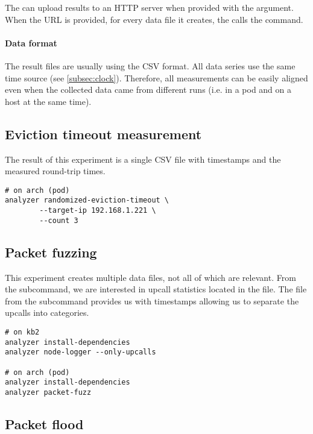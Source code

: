 The  can upload results to an HTTP server when provided with the  argument. When the URL is provided, for every data file it creates, the  calls the  command. 

\paragraph{Data format}

The result files are usually using the CSV format. All data series use the same time source (see \cref{subsec:clock}). Therefore, all measurements can be easily aligned even when the collected data came from different  runs (i.e. in a pod and on a host at the same time).

\subsection{Eviction timeout measurement}

The result of this experiment is a single CSV file with timestamps and the measured round-trip times.

\begin{verbatim}
# on arch (pod)
analyzer randomized-eviction-timeout \
		--target-ip 192.168.1.221 \
		--count 3
\end{verbatim}

\subsection{Packet fuzzing}

This experiment creates multiple data files, not all of which are relevant. From the  subcommand, we are interested in upcall statistics located in the  file. The  file from the  subcommand provides us with timestamps allowing us to separate the upcalls into categories.

\begin{verbatim}
# on kb2
analyzer install-dependencies
analyzer node-logger --only-upcalls

# on arch (pod)
analyzer install-dependencies
analyzer packet-fuzz
\end{verbatim}


\subsection{Packet flood}

